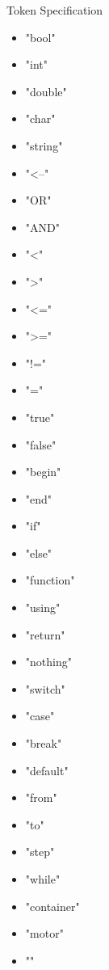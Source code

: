 
Token Specification 

\begin{itemize}

\item "bool"
\item "int"
\item "double"
\item "char"
\item "string"
\item "<--"
\item "OR"
\item "AND"
\item "<"
\item ">"
\item "<="
\item ">="
\item "!="
\item "="
\item "true"
\item "false"
\item "begin"
\item "end"
\item "if"
\item "else"
\item "function"
\item "using"
\item "return"
\item "nothing"
\item "switch"
\item "case"
\item "break"
\item "default"
\item "from"
\item "to"
\item "step"
\item "while"



\item "container"
\item "motor"

\item ""
\end{itemize}
